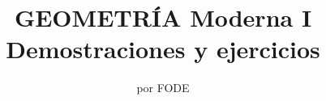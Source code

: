 \normalfont

\author{\Large por FODE}
\title{GEOMETRÍA Moderna I \\ \small Demostraciones y ejercicios}
\date{}
\pagestyle{empty}
\maketitle
\thispagestyle{empty}
\let\cleardoublepage\clearpage
\tableofcontents 								%


 
\let\cleardoublepage\clearpage